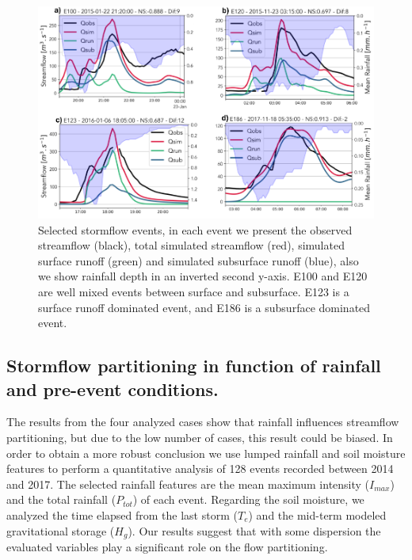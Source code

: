 \documentclass[preprint,12pt]{elsarticle}
\begin{document}
\begin{figure}[t]
    \centering
    \includegraphics[width=14cm]{Figuras/Cuatro_eventos.png}
    \caption{Selected stormflow events, in each event we present the observed streamflow (black), total simulated streamflow (red), simulated surface runoff (green) and simulated subsurface runoff (blue), also we show rainfall depth in an inverted second y-axis. E100 and E120 are well mixed events between surface and subsurface. E123 is a surface runoff dominated event, and E186 is a subsurface dominated event.}
    \label{fig:four_events}
\end{figure}

\subsection{Stormflow partitioning in function of rainfall and pre-event conditions.}

The results from the four analyzed cases show that rainfall influences streamflow partitioning, but due to the low number of cases, this result could be biased.   In order to obtain a more robust conclusion we use lumped rainfall and soil moisture features to perform a quantitative analysis of 128 events recorded between 2014 and 2017. The selected rainfall features are the mean maximum intensity ($I_{max}$) and the total rainfall ($P_{tot}$) of each event.  Regarding the soil moisture, we analyzed the time elapsed from the last storm ($T_e$) and the mid-term modeled gravitational storage ($H_g$).  Our results suggest that with some dispersion the evaluated variables play a significant role on the flow partitioning.\\   
\end{document}
